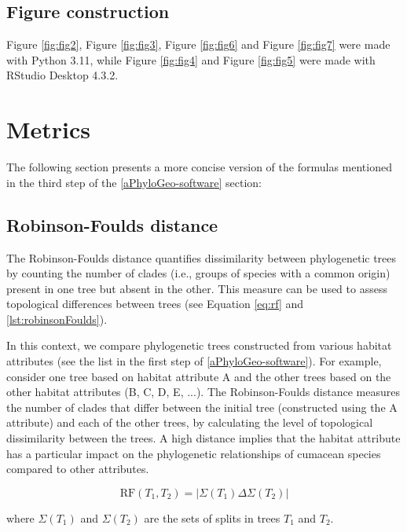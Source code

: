 \subsection{Figure construction}
Figure \ref{fig:fig2}, Figure \ref{fig:fig3}, Figure \ref{fig:fig6} and Figure \ref{fig:fig7} were made with Python 3.11, while Figure \ref{fig:fig4} and Figure \ref{fig:fig5} were made with RStudio Desktop 4.3.2.

\section{Metrics}\label{metrics}
The following section presents a more concise version of the formulas mentioned in the third step of the \autoref{aPhyloGeo-software} section:

\subsection{Robinson-Foulds distance}\label{RF}

The Robinson-Foulds distance quantifies dissimilarity between phylogenetic trees by counting the number of clades  (i.e., groups of species with a common origin) present in one tree but absent in the other. This measure can be used to assess topological differences between trees (see Equation \eqref{eq:rf} and \autoref{lst:robinsonFoulds}). 

In this context, we compare phylogenetic trees constructed from various habitat attributes (see the list in the first step of \autoref{aPhyloGeo-software}). For example, consider one tree based on habitat attribute A and the other trees based on the other habitat attributes (B, C, D, E, ...). The Robinson-Foulds distance measures the number of clades that differ between the initial tree (constructed using the A attribute) and each of the other trees, by calculating the level of topological dissimilarity between the trees. A high distance implies that the habitat attribute has a particular impact on the phylogenetic relationships of cumacean species compared to other attributes.

\begin{equation}\label{eq:rf}
    \text{RF}(T_1, T_2) = | \Sigma(T_1) \Delta \Sigma(T_2) |
\end{equation}

where $\Sigma(T_1)$ and $\Sigma(T_2)$ are the sets of splits in trees $T_1$ and $T_2$.

